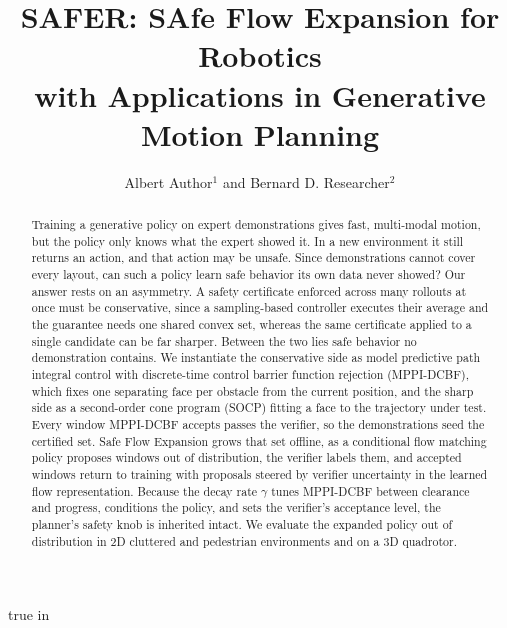 \documentclass[letterpaper, 10 pt, conference]{ieeeconf}
\title{\LARGE \bf
SAFER: SAfe Flow Expansion for Robotics \\ with Applications in Generative Motion Planning
}
\author{Albert Author$^{1}$ and Bernard D. Researcher$^{2}$}
\begin{document}
\maketitle
\thispagestyle{empty}
\pagestyle{empty}
 true in
\begin{abstract}

\color{blue}%
Training a generative policy on expert demonstrations gives fast, multi-modal motion, but the policy only knows what the expert showed it. In a new environment it still returns an action, and that action may be unsafe. Since demonstrations cannot cover every layout, can such a policy learn safe behavior its own data never showed? Our answer rests on an asymmetry. A safety certificate enforced across many rollouts at once must be conservative, since a sampling-based controller executes their average and the guarantee needs one shared convex set, whereas the same certificate applied to a single candidate can be far sharper. Between the two lies safe behavior no demonstration contains. We instantiate the conservative side as model predictive path integral control with discrete-time control barrier function rejection (MPPI-DCBF), which fixes one separating face per obstacle from the current position, and the sharp side as a second-order cone program (SOCP) fitting a face to the trajectory under test. Every window MPPI-DCBF accepts passes the verifier, so the demonstrations seed the certified set. Safe Flow Expansion grows that set offline, as a conditional flow matching policy proposes windows out of distribution, the verifier labels them, and accepted windows return to training with proposals steered by verifier uncertainty in the learned flow representation. Because the decay rate $\gamma$ tunes MPPI-DCBF between clearance and progress, conditions the policy, and sets the verifier's acceptance level, the planner's safety knob is inherited intact. We evaluate the expanded policy out of distribution in 2D cluttered and pedestrian environments and on a 3D quadrotor.



\end{abstract}
\end{document}
